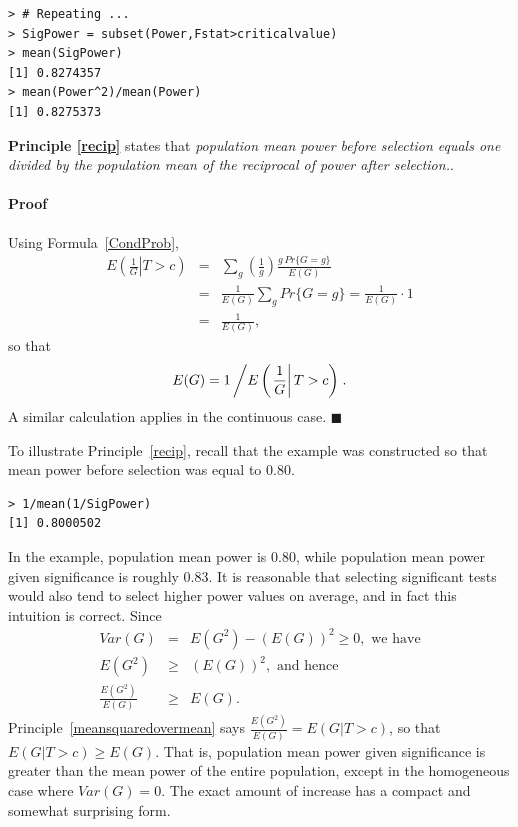 \documentclass[jou]{apa6} %
\begin{document}
{\footnotesize
\begin{verbatim}
> # Repeating ...
> SigPower = subset(Power,Fstat>criticalvalue)
> mean(SigPower)
[1] 0.8274357
> mean(Power^2)/mean(Power)
[1] 0.8275373
\end{verbatim}
} %

\textbf{Principle \ref{recip}} states that \emph{population mean power before selection equals one divided by the population mean of the reciprocal of power after selection.}.

\paragraph{Proof} Using Formula~\ref{CondProb}, 
\begin{eqnarray*}
      E\left(\left.\frac{1}{G}\right|T>c \right) 
      &=& \sum_g \left(\frac{1}{g}\right) \frac{g \, Pr\{G=g\}}{E(G)} \nonumber \\
      &=& \frac{1}{E(G)}\sum_g Pr\{G=g\} = \frac{1}{E(G)} \cdot 1 \nonumber \\
      &=& \frac{1}{E(G)},
\end{eqnarray*}
so that
\begin{equation*} 
    E(G) = 1\left/ E\left(\left.\frac{1}{G}\right|T>c \right) \right. .
\end{equation*}
A similar calculation applies in the continuous case. $\blacksquare$

\vspace{3mm}

\noindent
To illustrate Principle~\ref{recip}, recall that the example was constructed so that mean power before selection was equal to 0.80.
{\footnotesize
\begin{verbatim}
> 1/mean(1/SigPower)
[1] 0.8000502
\end{verbatim}
} %

In the example, population mean power is 0.80, while population mean power given significance is roughly 0.83. It is reasonable that selecting significant tests would also tend to select higher power values on average, and in fact this intuition is correct. Since
\begin{eqnarray*}
      Var(G) &=& E(G^2) - \left(E(G)\right)^2 \geq 0, \mbox{ we have} \\
      E(G^2) & \geq & \left(E(G)\right)^2, \mbox{ and hence}\\
      \frac{E(G^2)}{E(G)} &\geq& E(G).
\end{eqnarray*}
Principle~\ref{meansquaredovermean} says $\frac{E(G^2)}{E(G)} = E(G|T>c)$, so that $E(G|T>c) \geq E(G)$. That is, population mean power given significance is greater than the mean power of the entire population, except in the homogeneous case where $Var(G)=0$. The exact amount of increase has a compact and somewhat surprising form.
\end{document}
